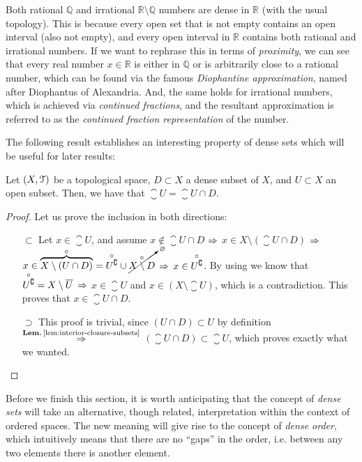 \begin{example}
	Both rational $\mathbb{Q}$ and irrational $\mathbb{R}\setminus\mathbb{Q}$ numbers are dense in $\mathbb{R}$ (with the usual topology). This is because every open set that is not empty contains an open interval (also not empty), and every open interval in $\mathbb{R}$ contains both rational and irrational numbers. If we want to rephrase this in terms of \emph{proximity}, we can see that every real number $x\in \mathbb{R}$ is either in $\mathbb{Q}$ or is arbitrarily close to a rational number, which can be found via the famous \emph{Diophantine approximation}, named after Diophantus of Alexandria. And, the same holds for irrational numbers, which is achieved via \emph{continued fractions}, and the resultant approximation is referred to as the \emph{continued fraction representation} of the number.
\end{example}

The following result establishes an interesting property of dense sets which will be useful for later results:

\begin{lemma}
	Let $(X,\EuScript{T})$ be a topological space, $D\subset X$ a dense subset of $X$, and $U\subset X$ an open subset. Then, we have that $\closure{U}=\closure{U\cap D}$.
\end{lemma}
\begin{proof}
Let us prove the inclusion in both directions:
\begin{itemize}
	\item[$\boxed{\subset}$] Let $x\in \closure{U}$, and assume $x\not\in \closure{U\cap D}$ $\Rightarrow$ $x\in X\setminus (\closure{U\cap D})$ $\Rightarrow$ $x\in \overbrace{X\setminus(U\cap D)}^{\circ} = \overset{\circ}{U^\complement}\cup \cancelto{\varnothing}{\overset{\circ}{X\setminus D}}$ $\Rightarrow$ $x\in \overset{\circ}{U^\complement}$. By using  we know that $\overset{\circ}{U^\complement}=X\setminus \overline{U}$ $\Rightarrow$ $x\in \closure{U}$ and $x\in (X\setminus \closure{U})$, which is a contradiction. This proves that $x\in \closure{U\cap D}$.
	\item[$\boxed{\supset}$] This proof is trivial, since $(U\cap D)\subset U$ by definition $\overset{\lemref{lem:interior-closure-subsets}}{\Then}$ $(\closure{U\cap D})\subset \closure{U}$, which proves exactly what we wanted.
\end{itemize}
\end{proof}

Before we finish this section, it is worth anticipating that the concept of \emph{dense sets} will take an alternative, though related, interpretation within the context of ordered spaces.
The new meaning will give rise to the concept of \emph{dense order}, which intuitively means that there are no ``gaps'' in the order, i.e. between any two elements there is another element.

